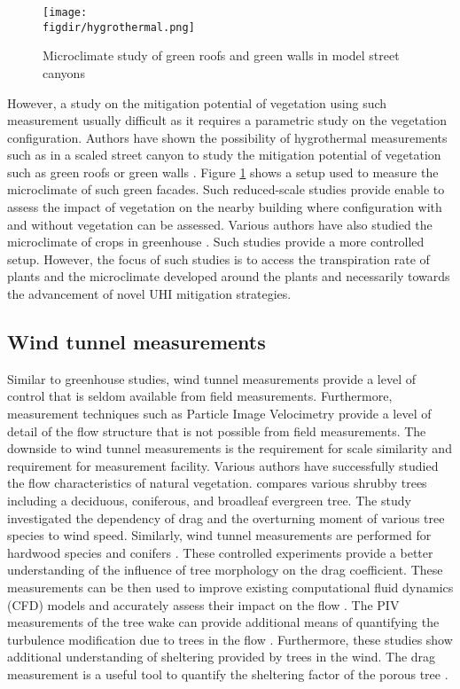 \begin{figure}[t]
	\centering
	\texttt{[image: \\figdir/hygrothermal.png]}
	\caption{Microclimate study of green roofs and green walls in model street canyons \citep{Djedjig2015}}
	\label{fig:hygrothermal}
\end{figure}

However, a study on the mitigation potential of vegetation using such measurement usually difficult as it requires a parametric study on the vegetation configuration. Authors have shown the possibility of hygrothermal measurements such as in a scaled street canyon to study the mitigation potential of vegetation such as green roofs or green walls \citep{Djedjig2015,Malys2014}. Figure \ref{fig:hygrothermal} shows a setup used to measure the microclimate of such green facades. Such reduced-scale studies provide enable to assess the impact of vegetation on the nearby building where configuration with and without vegetation can be assessed. Various authors have also studied the microclimate of crops in greenhouse \citep{Kichah2012,Baille1994,Roy, Montero2001,Fatnassi2006,Boulard2002}. Such studies provide a more controlled setup. However, the focus of such studies is to access the transpiration rate of plants and the microclimate developed around the plants and necessarily towards the advancement of novel UHI mitigation strategies. 

\subsection{Wind tunnel measurements}

Similar to greenhouse studies, wind tunnel measurements provide a level of control that is seldom available from field measurements. Furthermore, measurement techniques such as Particle Image Velocimetry provide a level of detail of the flow structure that is not possible from field measurements. The downside to wind tunnel measurements is the requirement for scale similarity and requirement for measurement facility. Various authors have successfully studied the flow characteristics of natural vegetation. \cite{Cao2012} compares various shrubby trees including a deciduous, coniferous, and broadleaf evergreen tree. The study investigated the dependency of drag and the overturning moment of various tree species to wind speed. Similarly, wind tunnel measurements are performed for hardwood species \citep{Vollsinger2005} and conifers \citep{Vollsinger2005, Mayhead1973, Bitog2011b}. These controlled experiments provide a better understanding of the influence of tree morphology on the drag coefficient. These measurements can be then used to improve existing computational fluid dynamics (CFD) models and accurately assess their impact on the flow \citep{Bitog2011b}. The PIV measurements of the tree wake can provide additional means of quantifying the turbulence modification due to trees in the flow \citep{Lee2012, Lee2014565}. Furthermore, these studies show additional understanding of sheltering provided by trees in the wind. The drag measurement is a useful tool to quantify the sheltering factor of the porous tree \citep{Guan2003,Kinnersley1994,Gromke2008a}.

